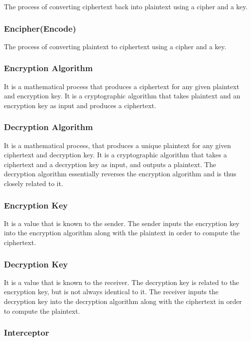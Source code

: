 \documentclass[british]{article}
\begin{document}
The process of converting ciphertext back into plaintext using a cipher
and a key.

\subsubsection{Encipher(Encode)}

The process of converting plaintext to ciphertext using a cipher and
a key.

\subsubsection{Encryption Algorithm}

It is a mathematical process that produces a ciphertext for any given
plaintext and encryption key. It is a cryptographic algorithm that
takes plaintext and an encryption key as input and produces a ciphertext.

\subsubsection{Decryption Algorithm}

It is a mathematical process, that produces a unique plaintext for
any given ciphertext and decryption key. It is a cryptographic algorithm
that takes a ciphertext and a decryption key as input, and outputs
a plaintext. The decryption algorithm essentially reverses the encryption
algorithm and is thus closely related to it.

\subsubsection{Encryption Key}

It is a value that is known to the sender. The sender inputs the encryption
key into the encryption algorithm along with the plaintext in order
to compute the ciphertext.

\subsubsection{Decryption Key}

It is a value that is known to the receiver. The decryption key is
related to the encryption key, but is not always identical to it.
The receiver inputs the decryption key into the decryption algorithm
along with the ciphertext in order to compute the plaintext.

\subsubsection{Interceptor}
\end{document}
